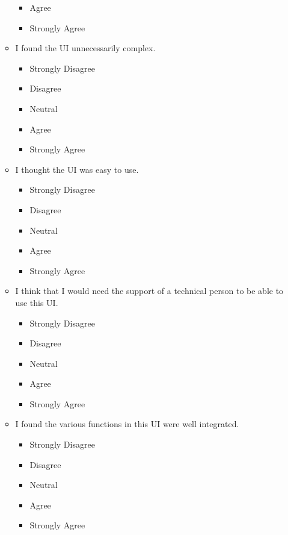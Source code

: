 \documentclass[doublespace,draft,nopageskip]{VTthesis} %
\begin{document}
\begin{itemize}
\begin{itemize}
\begin{itemize}
                \item Agree
                \item Strongly Agree
            \end{itemize}
	\item I found the UI unnecessarily complex.
            \begin{itemize}
                \item Strongly Disagree
                \item Disagree
                \item Neutral
                \item Agree
                \item Strongly Agree
            \end{itemize}
	\item I thought the UI was easy to use.
            \begin{itemize}
                \item Strongly Disagree
                \item Disagree
                \item Neutral
                \item Agree
                \item Strongly Agree
            \end{itemize}
        \item I think that I would need the support of a technical person to be able to use this UI.
            \begin{itemize}
                \item Strongly Disagree
                \item Disagree
                \item Neutral
                \item Agree
                \item Strongly Agree
            \end{itemize}
        \item I found the various functions in this UI were well integrated.
            \begin{itemize}
                \item Strongly Disagree
                \item Disagree
                \item Neutral
                \item Agree
                \item Strongly Agree
            \end{itemize}

\end{itemize}
\end{itemize}
\end{document}
